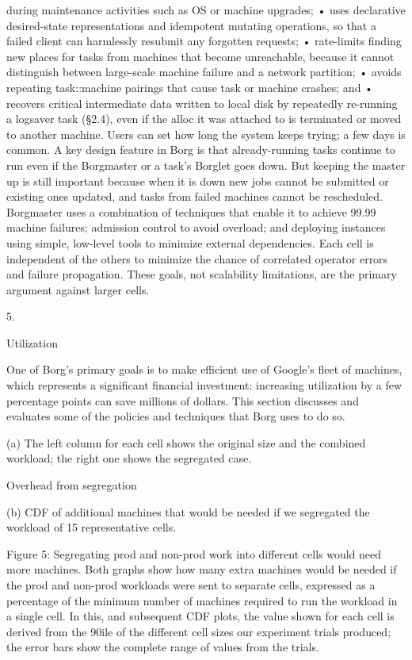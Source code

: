 during maintenance activities such as OS or machine
upgrades;
• uses declarative desired-state representations and idempotent mutating operations, so that a failed client can
harmlessly resubmit any forgotten requests;
• rate-limits finding new places for tasks from machines
that become unreachable, because it cannot distinguish
between large-scale machine failure and a network partition;
• avoids repeating task::machine pairings that cause task or
machine crashes; and
• recovers critical intermediate data written to local disk by
repeatedly re-running a logsaver task (§2.4), even if the
alloc it was attached to is terminated or moved to another
machine. Users can set how long the system keeps trying;
a few days is common.
A key design feature in Borg is that already-running tasks
continue to run even if the Borgmaster or a task’s Borglet
goes down. But keeping the master up is still important
because when it is down new jobs cannot be submitted
or existing ones updated, and tasks from failed machines
cannot be rescheduled.
Borgmaster uses a combination of techniques that enable
it to achieve 99.99%
machine failures; admission control to avoid overload; and
deploying instances using simple, low-level tools to minimize external dependencies. Each cell is independent of the
others to minimize the chance of correlated operator errors
and failure propagation. These goals, not scalability limitations, are the primary argument against larger cells.

5.

Utilization

One of Borg’s primary goals is to make efficient use of
Google’s fleet of machines, which represents a significant
financial investment: increasing utilization by a few percentage points can save millions of dollars. This section discusses and evaluates some of the policies and techniques that
Borg uses to do so.

(a) The left column for each cell shows the original size and the
combined workload; the right one shows the segregated case.

Overhead from segregation


(b) CDF of additional machines that would be needed if we
segregated the workload of 15 representative cells.

Figure 5: Segregating prod and non-prod work into different cells would need more machines. Both graphs show how many extra machines
would be needed if the prod and non-prod workloads were sent to separate cells, expressed as a percentage of the minimum number of
machines required to run the workload in a single cell. In this, and subsequent CDF plots, the value shown for each cell is derived from the
90ile of the different cell sizes our experiment trials produced; the error bars show the complete range of values from the trials.

